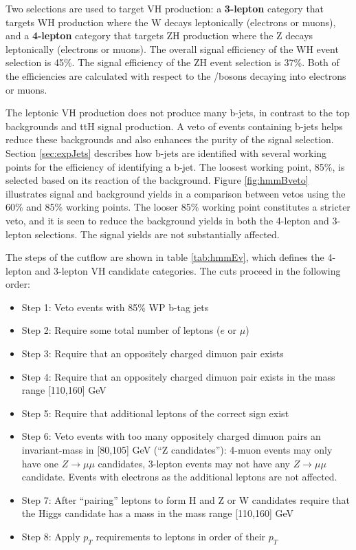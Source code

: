 Two selections are used to target VH production: a \textbf{3-lepton} category that targets WH production where the W decays leptonically (electrons or muons), and a \textbf{4-lepton} category that targets ZH production where the Z decays leptonically (electrons or muons).
The overall signal efficiency of the WH event selection is 45\%.
The signal efficiency of the ZH event selection is 37\%.
Both of the efficiencies are calculated with respect to the \W/\Z bosons decaying into electrons or muons.

The leptonic VH production does not produce many b-jets, in contrast to the top backgrounds and ttH signal production.
A veto of events containing b-jets helps reduce these backgrounds and also enhances the purity of the signal selection.
Section \ref{sec:expJets} describes how b-jets are identified with several working points for the efficiency of identifying a b-jet.
The loosest working point, 85\%, is selected based on its reaction of the background.
Figure \ref{fig:hmmBveto} illustrates signal and background yields in a comparison between vetos using the 60\% and 85\% working points.
The looser 85\% working point constitutes a stricter veto, and it is seen to reduce the background yields in both the 4-lepton and 3-lepton selections.
The signal yields are not substantially affected.

The steps of the cutflow are shown in table \ref{tab:hmmEv}, which defines the 4-lepton and 3-lepton VH candidate categories.
The cuts proceed in the following order:
\begin{itemize}
    \item Step 1: Veto events with 85\% WP b-tag jets
    \item Step 2: Require some total number of leptons ($e$ or $\mu$)
    \item Step 3: Require that an oppositely charged dimuon pair exists
    \item Step 4: Require that an oppositely charged dimuon pair exists in the mass range [110,160] GeV
    \item Step 5: Require that additional leptons of the correct sign exist
    \item Step 6: Veto events with too many oppositely charged dimuon pairs an invariant-mass in [80,105] GeV (``Z candidates''): 4-muon events may only have one $Z\to\mu\mu$ candidates, 3-lepton events may not have any $Z\to\mu\mu$ candidate. Events with electrons as the additional leptons are not affected.
    \item Step 7: After ``pairing'' leptons to form H and Z or W candidates require that the Higgs candidate has a mass in the mass range [110,160] GeV
    \item Step 8: Apply $p_T$ requirements to leptons in order of their $p_T$
\end{itemize}


